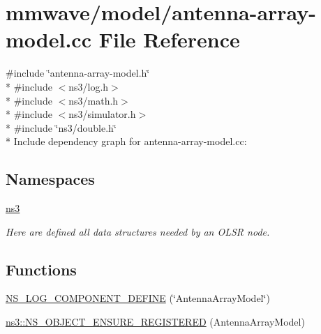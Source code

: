 \hypertarget{antenna-array-model_8cc}{}\section{mmwave/model/antenna-\/array-\/model.cc File Reference}
\label{antenna-array-model_8cc}
{\ttfamily \#include \char`\"{}antenna-\/array-\/model.\+h\char`\"{}}\\*
{\ttfamily \#include $<$ns3/log.\+h$>$}\\*
{\ttfamily \#include $<$ns3/math.\+h$>$}\\*
{\ttfamily \#include $<$ns3/simulator.\+h$>$}\\*
{\ttfamily \#include \char`\"{}ns3/double.\+h\char`\"{}}\\*
Include dependency graph for antenna-\/array-\/model.cc\+:
\subsection*{Namespaces}
\begin{DoxyCompactItemize}
\item 
 \hyperlink{namespacens3}{ns3}
\begin{DoxyCompactList}\small\item\em Here are defined all data structures needed by an O\+L\+SR node. \end{DoxyCompactList}\end{DoxyCompactItemize}
\subsection*{Functions}
\begin{DoxyCompactItemize}
\item 
\hyperlink{antenna-array-model_8cc_a13a734f1f3e7d93d5bc3bb1837c29b53}{N\+S\+\_\+\+L\+O\+G\+\_\+\+C\+O\+M\+P\+O\+N\+E\+N\+T\+\_\+\+D\+E\+F\+I\+NE} (\char`\"{}Antenna\+Array\+Model\char`\"{})
\item 
\hyperlink{namespacens3_a20ed16165dda6c9719ee0f78fa40917c}{ns3\+::\+N\+S\+\_\+\+O\+B\+J\+E\+C\+T\+\_\+\+E\+N\+S\+U\+R\+E\+\_\+\+R\+E\+G\+I\+S\+T\+E\+R\+ED} (Antenna\+Array\+Model)
\end{DoxyCompactItemize}
